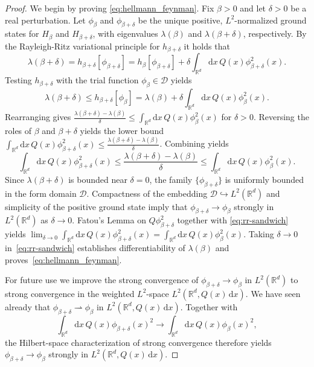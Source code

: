 \documentclass[11pt,reqno]{amsart}
\theoremstyle{definition}
\numberwithin{equation}{section}
\newcommand{\<}{\langle}
\renewcommand{\>}{\rangle}
\def\R{{\mathbb R}}
\def\de{{\rm d}}
\def\de{{\mathrm {d}}}
\def\bbR{{\mathbb{R}}}
\begin{document}
\begin{appendix}
\begin{proof}
We begin by proving \eqref{eq:hellmann_feynman}.
Fix $\beta > 0$ and let $\delta > 0$ be a real perturbation. Let $\phi_{\beta}$ and $\phi_{\beta+\delta}$ be the unique positive, $L^2$-normalized ground states for $H_{\beta}$ and $H_{\beta+\delta}$, with eigenvalues $\lambda(\beta)$ and $\lambda(\beta+\delta)$, respectively. By the Rayleigh-Ritz variational principle for $h_{\beta+\delta}$ it holds that
\[
\lambda(\beta+\delta) = h_{\beta+\delta}[\phi_{\beta+\delta}] = h_{\beta}[\phi_{\beta+\delta}] + \delta \int_{\mathbb{R}^d} \de x \, Q(x) \phi_{\beta+\delta}^2 (x).
\]
Testing $h_{\beta+\delta}$ with the trial function $\phi_{\beta} \in \mathcal{D}$ yields
\[
\lambda(\beta+\delta) \le h_{\beta+\delta}[\phi_{\beta}] = \lambda(\beta) + \delta \int_{\mathbb{R}^d} \de x \, Q(x) \phi_{\beta}^2(x).
\]
Rearranging gives $\frac{\lambda(\beta+\delta) - \lambda(\beta)}{\delta} \le \int_{\mathbb{R}^d} \de x \, Q(x) \phi_{\beta}^2 (x)$ for $\delta > 0$. Reversing the roles of $\beta$ and $\beta+\delta$ yields the lower bound $\int_{\mathbb{R}^d} \de x \, Q(x) \phi_{\beta+\delta}^2 (x) \le \frac{\lambda(\beta+\delta) - \lambda(\beta)}{\delta}$. Combining yields
\begin{equation}
\int_{\mathbb{R}^d} \de x \, Q(x) \phi_{\beta+\delta}^2 (x)  \le \frac{\lambda(\beta+\delta) - \lambda(\beta)}{\delta} \le \int_{\mathbb{R}^d} \de x \, Q(x) \phi_{\beta}^2 (x).
\label{eq:rr-sandwich}
\end{equation}
Since $\lambda(\beta+\delta)$ is bounded near $\delta = 0$, the family $\{\phi_{\beta+\delta}\}$ is uniformly bounded in the form domain $\mathcal{D}$. Compactness of the embedding $\mathcal{D}\hookrightarrow L^2(\mathbb{R}^d)$ and simplicity of the positive ground state imply that $\phi_{\beta+\delta}\to\phi_{\beta}$ strongly in $L^2(\mathbb{R}^d)$ as $\delta\to0$. Fatou's Lemma on $Q\phi_{\beta+\delta}^2$ together with \eqref{eq:rr-sandwich} yields $\lim_{\delta\to0}\int_{\mathbb{R}^d}\de x\,Q(x)\phi_{\beta+\delta}^2(x)=\int_{\mathbb{R}^d}\de x\,Q(x)\phi_{\beta}^2(x)$. Taking $\delta\to0$ in~\eqref{eq:rr-sandwich} establishes differentiability of $\lambda(\beta)$ and proves~\eqref{eq:hellmann_feynman}.

For future use we improve the strong convergence of $\phi_{\beta+\delta} \to \phi_\beta$ in $L^2(\bbR^d)$ to strong convergence in the weighted $L^2$-space $L^2(\R^d,Q(x)\,\de x)$. We have seen already that $\phi_{\beta+\delta}\rightharpoonup\phi_\beta$ in $L^2(\mathbb R^d,Q(x)\,\de x)$. 
Together with
\[
 \int_{\mathbb R^d}\de x \, Q(x)\phi_{\beta+\delta}(x)^2
 \longrightarrow
 \int_{\mathbb R^d} \de x \,Q(x)\phi_\beta(x)^2,
\]
the Hilbert-space characterization of strong convergence therefore yields $\phi_{\beta+\delta}\longrightarrow\phi_\beta$ strongly in $L^2(\mathbb R^d,Q(x)\,\de x)$.


\end{proof}
\end{appendix}
\end{document}
